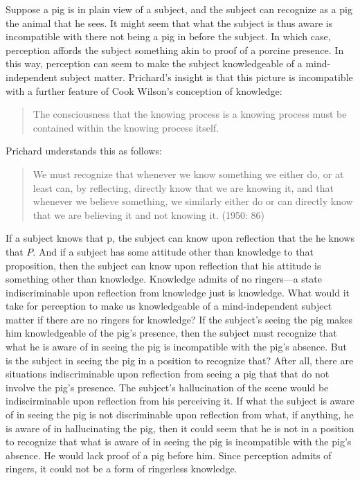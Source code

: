 Suppose a pig is in plain view of a subject, and the subject can recognize as a pig the animal that he sees. It might seem that what the subject is thus aware is incompatible with there not being a pig in before the subject. In which case, perception affords the subject something akin to proof of a porcine presence. In this way, perception can seem to make the subject knowledgeable of a mind-independent subject matter. Prichard's insight is that this picture is incompatible with a further feature of Cook Wilson's conception of knowledge:
\begin{quote}
	The consciousness that the knowing process is a knowing process must be contained within the knowing process itself. \citep[107]{Cook-Wilson:1926sf}
\end{quote}
Prichard understands this as follows:
\begin{quote}
	We must recognize that whenever we know something we either do, or at least can, by reflecting, directly know that we are knowing it, and that whenever we believe something, we similarly either do or can directly know that we are believing it and not knowing it. (1950: 86)
\end{quote}
If a subject knows that p, the subject can know upon reflection that the he knows that \( P \). And if a subject has some attitude other than knowledge to that proposition, then the subject can know upon reflection that his attitude is something other than knowledge. Knowledge admits of no ringers---a state indiscriminable upon reflection from knowledge just is knowledge. What would it take for perception to make us knowledgeable of a mind-independent subject matter if there are no ringers for knowledge? If the subject's seeing the pig makes him knowledgeable of the pig's presence, then the subject must recognize that what he is aware of in seeing the pig is incompatible with the pig's absence. But is the subject in seeing the pig in a position to recognize that? After all, there are situations indiscriminable upon reflection from seeing a pig that that do not involve the pig's presence. The subject's hallucination of the scene would be indiscirminable upon reflection from his perceiving it. If what the subject is aware of in seeing the pig is not discriminable upon reflection from what, if anything, he is aware of in hallucinating the pig, then it could seem that he is not in a position to recognize that what is aware of in seeing the pig is incompatible with the pig's absence. He would lack proof of a pig before him. Since perception admits of ringers, it could not be a form of ringerless knowledge.

